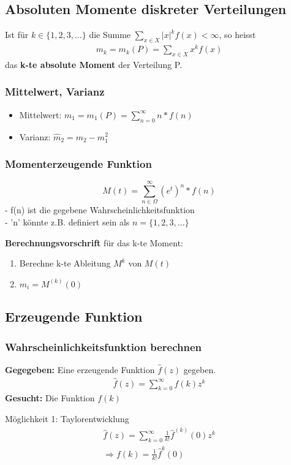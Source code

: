 \documentclass{article}
\begin{document}
\subsection{Absoluten Momente diskreter Verteilungen}
Ist f\"ur $k \in \{1,2,3,\ldots\}$ die Summe $\sum_{x \in X} |x|^kf(x) < \infty$,
so heisst
\begin{align}
	m_k = m_k(P) = \sum_{x \in X} x^kf(x)
\end{align}
das \textbf{k-te absolute Moment} der Verteilung P.

\subsubsection{Mittelwert, Varianz}
\begin{itemize}
	\item Mittelwert: $m_1 = m_1(P) = \sum_{n=0}^\infty n*f(n)$
	\item Varianz: $\widehat{m}_2 = m_2 - m_1^2$
\end{itemize}
\subsubsection{Momenterzeugende Funktion}
\[
	M(t)=\sum_{n\in\Omega}^{\infty}(e^t)^n * f(n)
\]
- f(n) ist die gegebene Wahrscheinlichkeitsfunktion\\
- 'n' k\"onnte z.B. definiert sein als $n=\{1,2,3,...\}$

\vspace*{15pt}
\textbf{Berechnungsvorschrift} f\"ur das k-te Moment:
\begin{enumerate}
	\item Berechne k-te Ableitung $M^k$ von $M(t)$
	\item $m_i = M^{(k)}(0)$
\end{enumerate}
\subsection{Erzeugende Funktion}
\subsubsection{Wahrscheinlichkeitsfunktion berechnen}
\textbf{Gegegeben:} Eine erzeugende Funktion $\hat{f}(z)$ gegeben.
\begin{align}
	\hat{f}(z) = \sum^{\infty}_{k=0} f(k)z^k
\end{align}
\textbf{Gesucht:} Die Funktion $f(k)$

M\"oglichkeit 1: Taylorentwicklung
\begin{align}
	\hat{f}(z) = \sum_{k=0}^{\infty} \frac{1}{k!}\hat{f}^{(k)}(0)z^k\\
	\Rightarrow f(k) = \frac{1}{k!} \hat{f}^{k}(0)
\end{align}
\end{document}
